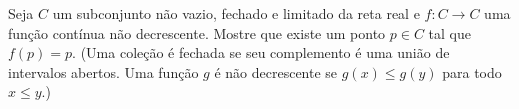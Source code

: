 Seja \( C\) um subconjunto não vazio, fechado e limitado da reta real e \( f\colon  C\to C\) uma função contínua não decrescente. Mostre que existe um ponto \( p\in C\) tal que \( f(p) = p\).
(Uma coleção é fechada se seu complemento é uma união de intervalos abertos. Uma função \( g\) é não decrescente se \( g(x)\le g(y)\) para todo \( x\le y\).)
